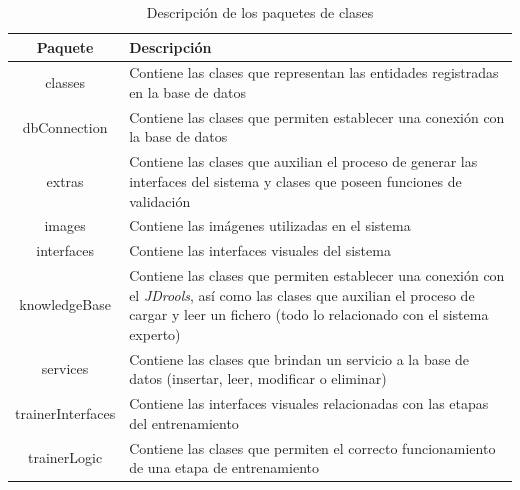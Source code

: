 \begin{table}[H]
\centering
\begin{center}
\begin{tabular}{ | c | p{11.5cm} | }
\hline
\textbf{Paquete} & \textbf{Descripción}\\
\hline
classes & Contiene las clases que representan las entidades registradas en la base de datos \\
\hline
dbConnection & Contiene las clases que permiten establecer una conexión con la base de datos \\
\hline
extras & Contiene las clases que auxilian el proceso de generar las interfaces del sistema y clases que poseen funciones de validación \\
\hline
images & Contiene las imágenes utilizadas en el sistema \\
\hline
interfaces & Contiene las interfaces visuales del sistema \\
\hline
knowledgeBase & Contiene las clases que permiten establecer una conexión con el \textsl{JDrools}, así como las clases que auxilian el proceso de cargar y leer un fichero (todo lo relacionado con el sistema experto) \\
\hline
services & Contiene las clases que brindan un servicio a la base de datos (insertar, leer, modificar o eliminar) \\
\hline
trainerInterfaces & Contiene las interfaces visuales relacionadas con las etapas del entrenamiento \\
\hline
trainerLogic &  Contiene las clases que permiten el correcto funcionamiento de una etapa de entrenamiento \\
\hline
\end{tabular}
\caption{Descripción de los paquetes de clases}
\label{tab:paquetes}
\end{center}
\end{table}